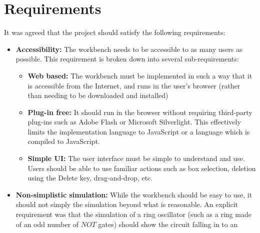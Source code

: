 \chapter{Requirements}
It was agreed that the project should satisfy the following requirements:

\begin{itemize}
	\item \textbf{Accessibility:} The workbench needs to be accessible to as many users as possible. This requirement is broken down into several sub-requirements:
	
		\begin{itemize}
			\item \textbf{Web based:} The workbench must be implemented in such a way that it is accessible from the Internet, and runs in the user's browser (rather than needing to be downloaded and installed) 
			
			\item \textbf{Plug-in free:} It should run in the browser without requiring third-party plug-ins such as Adobe Flash or Microsoft Silverlight. This effectively limits the implementation language to JavaScript or a language which is compiled to JavaScript.
			
			\item \textbf{Simple UI:} The user interface must be simple to understand and use. Users should be able to use familiar actions such as box selection, deletion using the Delete key, drag-and-drop, etc.
		\end{itemize}
	
	\item \textbf{Non-simplistic simulation:} While the workbench should be easy to use, it should not simply the simulation beyond what is reasonable. An explicit requirement was that the simulation of a ring oscillator (such as a ring made of an odd number of $NOT$ gates) should show the circuit falling in to an
\end{itemize}


